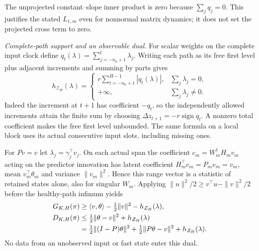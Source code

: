 \documentclass[journal]{IEEEtran}
\begin{document}
The unprojected constant--slope inner product is zero because
$\sum_jq_j=0$. This justifies the stated $L_{1,m}$ even for nonnormal
matrix dynamics; it does not set the projected cross term to zero.

\par\smallskip\noindent\textit{Complete-path support and an observable dual.}\enspace 
For scalar weights on the complete input clock define
$q_t(\lambda)=\sum_{j=-n_0+1}^t\lambda_j$.
Writing each path as its free first level plus adjacent increments and
summing by parts gives
\begin{equation}\label{sf:support}
h_{\mathcal Z_H}(\lambda)=
\begin{cases}
r\displaystyle\sum_{t=-n_0+1}^{H-1}|q_t(\lambda)|,
 &\displaystyle\sum_j\lambda_j=0,\\
+\infty,&\displaystyle\sum_j\lambda_j\ne0.
\end{cases}
\end{equation}
Indeed the increment at $t+1$ has coefficient $-q_t$, so the independently
allowed increments attain the finite sum by choosing
$\Delta z_{t+1}=-r\operatorname{sign}q_t$. A nonzero total coefficient makes
the free first level unbounded. The same formula on a local block uses
its actual consecutive input slots, including missing ones.

For $Pv=v$ let $\lambda_j=\gamma_j^\top v_j$. On each actual span the
coefficient $c_m=W_m^\dagger H_mv_m$ acting on the predictor innovation has
latent coefficient $H_m^\top c_m=P_mv_m=v_m$, mean $v_m^\top\theta_m$
and variance $\|v_m\|^2$. Hence this range vector is a statistic of retained
states alone, also for singular $W_m$. Applying
$\|u\|^2/2\ge v^\top u-\|v\|^2/2$ before the healthy-path infimum yields
\begin{align}
G_{K,H}(\pi)&\ge\langle v,\theta\rangle-\tfrac12\|v\|^2
-h_{\mathcal Z_H}(\lambda),\notag\\
D_{K,H}(\pi)&\le\tfrac12\|\theta-v\|^2+h_{\mathcal Z_H}(\lambda)\notag\\
&=\tfrac12\|(I-P)\theta\|^2+\tfrac12\|P\theta-v\|^2
+h_{\mathcal Z_H}(\lambda).
\label{sf:dual}
\end{align}
No data from an unobserved input or fast state enter this dual.
\end{document}
